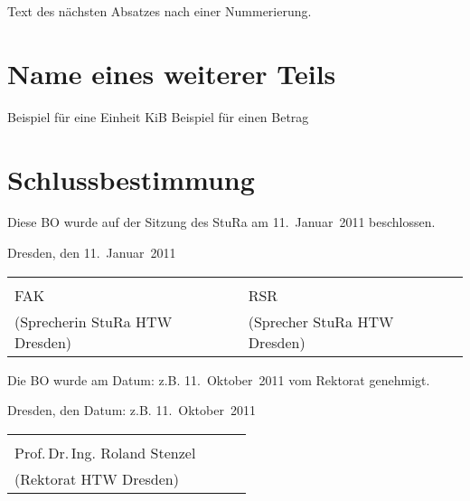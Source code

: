 \documentclass[
    pdftex,
]{scrartcl}
\begin{document}
\begin{contract}
Text des nächsten Absatzes nach einer Nummerierung.

\parnumberfalse\part{Name eines weiterer Teils}\parnumbertrue

Beispiel für eine Einheit \unit[23]{KiB}
Beispiel für einen Betrag 

\parnumberfalse\part{Schlussbestimmung}\parnumbertrue


\newpage

\parnumberfalse{}\parnumbertrue

Diese BO wurde auf der Sitzung des StuRa am 11.~Januar~2011 beschlossen.

\end{contract}

\parnumberfalse{}\parnumbertrue

Dresden, den 11.~Januar~2011

\vfill

\noindent
\begin{tabularx}{\linewidth}{lXlX}
\dotfill				& 	& \dotfill				& \tabularnewline
FAK					&	& RSR					& \tabularnewline
\tiny(Sprecherin StuRa HTW Dresden)	&	& \tiny(Sprecher StuRa HTW Dresden)	& \tabularnewline
\end{tabularx}

\vfill
\vfill

\parnumberfalse{}\parnumbertrue

Die BO wurde am {Datum: z.B. 11.~Oktober~2011} vom Rektorat genehmigt.

\parnumberfalse{}\parnumbertrue

Dresden, den {Datum: z.B. 11.~Oktober~2011}

\vfill

\noindent
\begin{tabularx}{\linewidth}{lXlX}
\dotfill			&	& 	& \tabularnewline
Prof.\,Dr.\,Ing. Roland Stenzel	&	& 	& \tabularnewline
\tiny(Rektorat HTW Dresden)	&	& 	& \tabularnewline
\end{tabularx}

\vfill
\vfill
\end{document}
